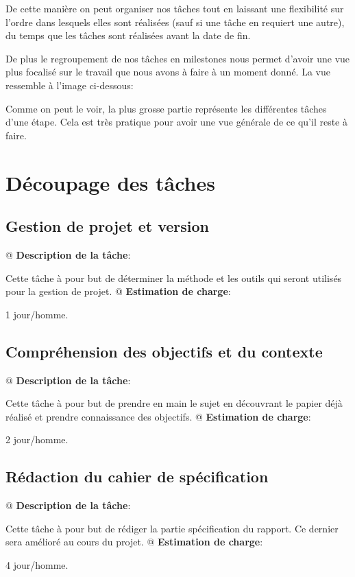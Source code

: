 \documentclass[noposter,final]{polytech/polytech}
\begin{document}
		De cette manière on peut organiser nos tâches tout en laissant une flexibilité sur l'ordre dans lesquels elles sont réalisées (sauf si une tâche en requiert une autre), du temps que les tâches sont réalisées avant la date de fin.
		
		De plus le regroupement de nos tâches en milestones nous permet d'avoir une vue plus focalisé sur le travail que nous avons à faire à un moment donné.
		La vue ressemble à l'image ci-dessous:
		
		Comme on peut le voir, la plus grosse partie représente les différentes tâches d'une étape. Cela est très pratique pour avoir une vue générale de ce qu'il reste à faire.
	
	\section{Découpage des tâches}
		\subsection{Gestion de projet et version}
			\begin{easylist}
				@ \textbf{Description de la tâche}:
				
				Cette tâche à pour but de déterminer la méthode et les outils qui seront utilisés pour la gestion de projet.
				@ \textbf{Estimation de charge}:
				
				1 jour/homme.
			\end{easylist}
			
		\subsection{Compréhension des objectifs et du contexte}
			\begin{easylist}
				@ \textbf{Description de la tâche}:
				
				Cette tâche à pour but de prendre en main le sujet en découvrant le papier déjà réalisé et prendre connaissance des objectifs.
				@ \textbf{Estimation de charge}:
				
				2 jour/homme.
			\end{easylist}
			
		\subsection{Rédaction du cahier de spécification}
			\begin{easylist}
				@ \textbf{Description de la tâche}:
				
				Cette tâche à pour but de rédiger la partie spécification du rapport. Ce dernier sera amélioré au cours du projet.
				@ \textbf{Estimation de charge}:
				
				4 jour/homme.
			\end{easylist}
			
\end{document}
